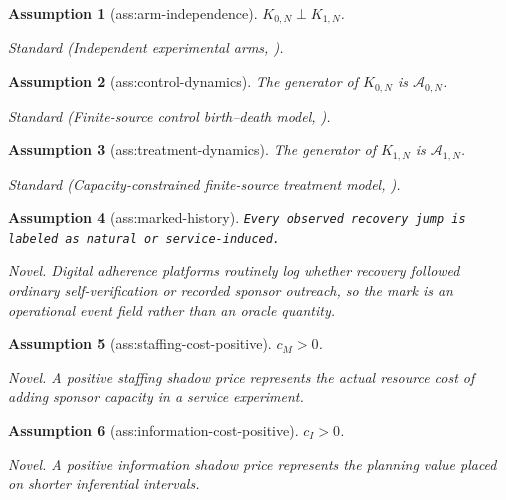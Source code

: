 \documentclass{article}
\newtheorem{assumption}{Assumption}
\begin{document}
\begin{assumption}[ass:arm-independence]\label{ass:arm-independence}
\(K_{0,N}\perp K_{1,N}\).
\par\smallskip\noindent\emph{Standard} (Independent experimental arms, \cite{BoutilierJonassonLiYoeli2024}).
\end{assumption}

\begin{assumption}[ass:control-dynamics]\label{ass:control-dynamics}
The generator of \(K_{0,N}\) is \(\mathcal A_{0,N}\).
\par\smallskip\noindent\emph{Standard} (Finite-source control birth--death model, \cite{BoutilierJonassonLiYoeli2024}).
\end{assumption}

\begin{assumption}[ass:treatment-dynamics]\label{ass:treatment-dynamics}
The generator of \(K_{1,N}\) is \(\mathcal A_{1,N}\).
\par\smallskip\noindent\emph{Standard} (Capacity-constrained finite-source treatment model, \cite{BoutilierJonassonLiYoeli2024}).
\end{assumption}

\begin{assumption}[ass:marked-history]\label{ass:marked-history}
\texttt{Every observed recovery jump is labeled as natural or service-\allowbreak{}induced.}
\par\smallskip\noindent\emph{Novel.} Digital adherence platforms routinely log whether recovery followed ordinary self-verification or recorded sponsor outreach, so the mark is an operational event field rather than an oracle quantity.
\end{assumption}

\begin{assumption}[ass:staffing-cost-positive]\label{ass:staffing-cost-positive}
\(c_M>0\).
\par\smallskip\noindent\emph{Novel.} A positive staffing shadow price represents the actual resource cost of adding sponsor capacity in a service experiment.
\end{assumption}

\begin{assumption}[ass:information-cost-positive]\label{ass:information-cost-positive}
\(c_I>0\).
\par\smallskip\noindent\emph{Novel.} A positive information shadow price represents the planning value placed on shorter inferential intervals.
\end{assumption}
\end{document}
